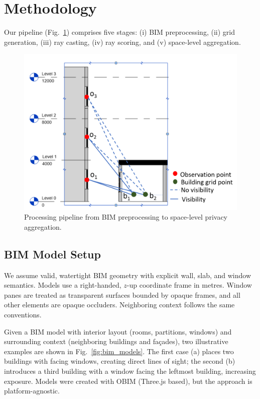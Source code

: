 \documentclass[final,3p,times,review]{elsarticle}
\begin{document}
\section{Methodology}
Our pipeline (Fig.~\ref{fig:pipeline}) comprises five stages:
(i) BIM preprocessing, (ii) grid generation, (iii) ray casting,
(iv) ray scoring, and (v) space-level aggregation.

\begin{figure}[H]
    \centering
    \includegraphics[width=0.8\linewidth]{visibility.png}
    \caption{Processing pipeline from BIM preprocessing to space-level privacy aggregation.}
    \label{fig:pipeline}
\end{figure}

\subsection{BIM Model Setup}
We assume valid, watertight BIM geometry with explicit wall, slab, and window semantics. Models use a right-handed, $z$-up coordinate frame in metres. Window panes are treated as transparent surfaces bounded by opaque frames, and all other elements are opaque occluders. Neighboring context follows the same conventions.

Given a BIM model with interior layout (rooms, partitions, windows) and surrounding context (neighboring buildings and façades), two illustrative examples are shown in Fig.~\ref{fig:bim_models}. The first case (a) places two buildings with facing windows, creating direct lines of sight; the second (b) introduces a third building with a window facing the leftmost building, increasing exposure. Models were created with OBIM (Three.js based), but the approach is platform-agnostic.
\end{document}
